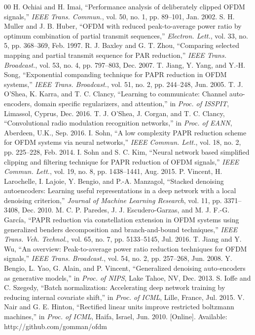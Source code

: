 \documentclass[journal]{IEEEtran}
\begin{document}
\begin{thebibliography}{00}
 H. Ochiai and H. Imai, ``Performance analysis of deliberately clipped OFDM signals,'' \emph{IEEE Trans. Commun.}, vol. 50, no. 1, pp. 89--101, Jan. 2002.
 S. H. Muller and J. B. Huber, ``OFDM with reduced peak-to-average power ratio by optimum combination of partial transmit sequences,'' \emph{Electron. Lett.}, vol. 33, no. 5, pp. 368--369, Feb. 1997.
 R. J. Baxley and G. T. Zhou, ``Comparing selected mapping and partial transmit sequence for PAR reduction,'' \emph{IEEE Trans. Broadcast.}, vol. 53, no. 4, pp. 797--803, Dec. 2007.
 T. Jiang, Y. Yang, and Y.-H. Song, ``Exponential companding technique for PAPR reduction in OFDM systems,'' \emph{IEEE Trans. Broadcast.}, vol. 51, no. 2, pp. 244--248, Jun. 2005.
 T. J. O'Shea, K. Karra, and T. C. Clancy, ``Learning to communicate: Channel auto-encoders, domain specific regularizers, and attention,'' in \emph{Proc. of ISSPIT}, Limassol, Cyprus, Dec. 2016.
 T. J. O'Shea, J. Corgan, and T. C. Clancy, ``Convolutional radio modulation recognition networks,'' in \emph{Proc. of EANN}, Aberdeen, U.K., Sep. 2016.
 I. Sohn, ``A low complexity PAPR reduction scheme for OFDM systems via neural networks,'' \emph{IEEE Commun. Lett.}, vol. 18, no. 2, pp. 225--228, Feb. 2014.
 I. Sohn and S. C. Kim, ``Neural network based simplified clipping and filtering technique for PAPR reduction of OFDM signals,'' \emph{IEEE Commun. Lett.}, vol. 19, no. 8, pp. 1438--1441, Aug. 2015.
 P. Vincent, H. Larochelle, I. Lajoie, Y. Bengio, and P.-A. Manzagol, ``Stacked denoising autoencoders: Learning useful representations in a deep network with a local denoising criterion,'' \emph{Journal of Machine Learning Research}, vol. 11, pp. 3371--3408, Dec. 2010.
 M. C. P. Paredes, J. J. Escudero-Garzas, and M. J. F.-G. Garc\'ia, ``PAPR reduction via constellation extension in OFDM systems using generalized benders decomposition and branch-and-bound techniques,'' \emph{IEEE Trans. Veh. Technol.}, vol. 65, no. 7, pp. 5133--5145, Jul. 2016.
 T. Jiang and Y. Wu, ``An overview: Peak-to-average power ratio reduction techniques for OFDM signals,'' \emph{IEEE Trans. Broadcast.}, vol. 54, no. 2, pp. 257--268, Jun. 2008.
 Y. Bengio, L. Yao, G. Alain, and P. Vincent, ``Generalized denoising auto-encoders as generative models,'' in \emph{Proc. of NIPS}, Lake Tahoe, NV, Dec. 2013.
 S. Ioffe and C. Szegedy, ``Batch normalization: Accelerating deep network training by reducing internal covariate shift,'' in \emph{Proc. of ICML}, Lille, France, Jul. 2015.
 V. Nair and G. E. Hinton, ``Rectified linear units improve restricted boltzmann machines,'' in \emph{Proc. of ICML}, Haifa, Israel, Jun. 2010.
 [Online]. Available: http://github.com/gomman/ofdm
\end{thebibliography}
\end{document}
